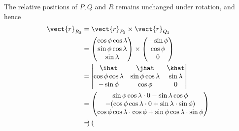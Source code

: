 \begin{enumerate}
          The relative positions of \(P, Q\) and \(R\) remains unchanged under rotation, and hence
          \begin{align*}
              \vect{r}_{R_2} & = \vect{r}_{P_2} \times \vect{r}_{Q_2}                                           \\
                             & = \begin{pmatrix}
                                     \cos \phi \cos \lambda \\
                                     \sin \phi \cos \lambda \\
                                     \sin \lambda
                                 \end{pmatrix} \times \begin{pmatrix}
                                                          - \sin \phi \\
                                                          \cos \phi   \\
                                                          0
                                                      \end{pmatrix}                                            \\
                             & = \begin{vmatrix}
                                     \ihat                  & \jhat                  & \khat        \\
                                     \cos \phi \cos \lambda & \sin \phi \cos \lambda & \sin \lambda \\
                                     - \sin \phi            & \cos \phi              & 0
                                 \end{vmatrix}                 \\
                             & = \begin{pmatrix}
                                     \sin \phi \cos \lambda \cdot 0 - \sin \lambda \cos \phi           \\
                                     - (\cos \phi \cos \lambda \cdot 0 + \sin \lambda \cdot \sin \phi) \\
                                     \cos \phi \cos \lambda \cdot \cos \phi + \sin \phi \cos \lambda \cdot \sin \phi
                                 \end{pmatrix} \\
                             & = \begin{pmatrix}

\end{pmatrix}
\end{align*}
\end{enumerate}
